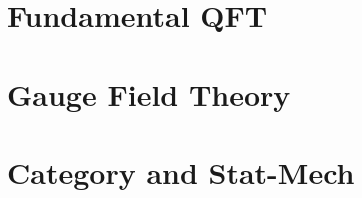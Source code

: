 \documentclass[12pt]{report}
\begin{document}
\title{}
\author{Yu Liu}

\maketitle


\begin{abstract}
  这是我个人的学习的笔记，主要讲述关于量子场论，量子力学，统计力学，以及量子场论的一些高阶内容。
  这个笔记综合了很多教材和文章的内容。包括但不限于Weiberg...
\end{abstract}
\tableofcontents


\chapter{Fundamental QFT}


\chapter{Gauge Field Theory}


\newpage
\chapter{Category and Stat-Mech}


\end{document}
